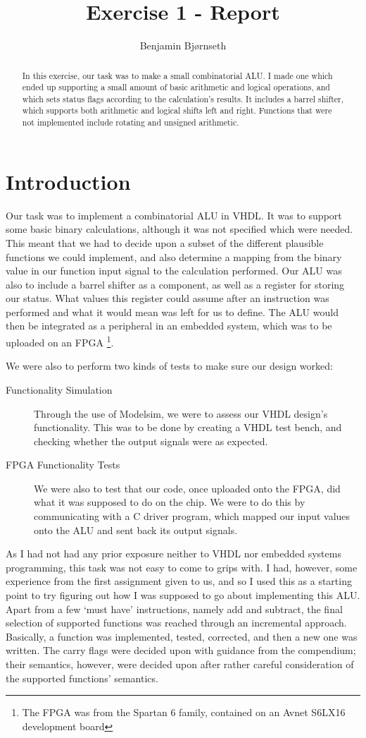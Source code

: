 \documentclass{article}
\title{Exercise 1 - Report}
\author{Benjamin Bj\o rnseth}
\begin{document}
\maketitle 
\begin{abstract}
In this exercise, our task was to make a small combinatorial ALU. I made one which ended up supporting a small amount of basic arithmetic and logical operations, and which sets status flags according to the calculation's results. It includes a barrel shifter, which supports both arithmetic and logical shifts left and right. Functions that were not implemented include rotating and unsigned arithmetic.
\end{abstract}

\section{Introduction}
\label{sec:introduction}
Our task was to implement a combinatorial ALU in VHDL. It was to support some basic binary calculations, although it was not specified which were needed. This meant that we had to decide upon a subset of the different plausible functions we could implement, and also determine a mapping from the binary value in our function input signal to the calculation performed. Our ALU was also to include a barrel shifter as a component, as well as a register for storing our status. What values this register could assume after an instruction was performed and what it would mean was left for us to define. The ALU would then be integrated as a peripheral in an embedded system, which was to be uploaded on an FPGA \footnote{The FPGA was from the Spartan 6 family, contained on an Avnet S6LX16 development board}. 

We were also to perform two kinds of tests to make sure our design worked:
\begin{description}
\item[Functionality Simulation] Through the use of Modelsim, we were to assess our VHDL design's functionality. This was to be done by creating a VHDL test bench, and checking whether the output signals were as expected.
\item[FPGA Functionality Tests] We were also to test that our code, once uploaded onto the FPGA, did what it was supposed to do on the chip. We were to do this by communicating with a C driver program, which mapped our input values onto the ALU and sent back its output signals.
\end{description}

As I had not had any prior exposure neither to VHDL nor embedded systems programming, this task was not easy to come to grips with. I had, however, some experience from the first assignment given to us, and so I used this as a starting point to try figuring out how I was supposed to go about implementing this ALU. Apart from a few `must have' instructions, namely add and subtract, the final selection of supported functions was reached through an incremental approach. Basically, a function was implemented, tested, corrected, and then a new one was written. The carry flags were decided upon with guidance from the compendium; their semantics, however, were decided upon after rather careful consideration of the supported functions' semantics. 
\end{document}

